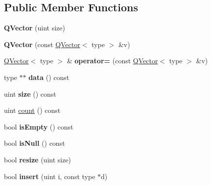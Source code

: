 \subsection*{Public Member Functions}
\begin{DoxyCompactItemize}
\item 
\mbox{\label{class_q_vector_a00272033a3dbacb138c52276ac6a88d1}} 
{\bfseries Q\+Vector} (uint size)
\item 
\mbox{\label{class_q_vector_a641d2525bcf81ac885b2a4b494b64f2d}} 
{\bfseries Q\+Vector} (const \mbox{\hyperlink{class_q_vector}{Q\+Vector}}$<$ type $>$ \&v)
\item 
\mbox{\label{class_q_vector_a07a47bb985bb86befdf9da8abe82b949}} 
\mbox{\hyperlink{class_q_vector}{Q\+Vector}}$<$ type $>$ \& {\bfseries operator=} (const \mbox{\hyperlink{class_q_vector}{Q\+Vector}}$<$ type $>$ \&v)
\item 
\mbox{\label{class_q_vector_af9ad70c3603944c6ce9b123a65aa7a27}} 
type $\ast$$\ast$ {\bfseries data} () const
\item 
\mbox{\label{class_q_vector_a4759041463a739fb6e82a1b2907196b4}} 
uint {\bfseries size} () const
\item 
uint \mbox{\hyperlink{class_q_vector_a7fa63591f2256a78f5ba439cc858b09d}{count}} () const
\item 
\mbox{\label{class_q_vector_a1f5d362213db7dc9f997b265a250f96b}} 
bool {\bfseries is\+Empty} () const
\item 
\mbox{\label{class_q_vector_a57bf68d5d8e54849bc0a0eb0e2128213}} 
bool {\bfseries is\+Null} () const
\item 
\mbox{\label{class_q_vector_aa19a2610fbe7a0e39bef980974398d37}} 
bool {\bfseries resize} (uint size)
\item 
\mbox{\label{class_q_vector_a659efd64c0ccb0a06f2d1dc04f5f2b79}} 
bool {\bfseries insert} (uint i, const type $\ast$d)
\item 
\mbox{\label{class_q_vector_ab404cd252fc0945fc27e33316d4d5621}} 
$$
\end{DoxyCompactItemize}
